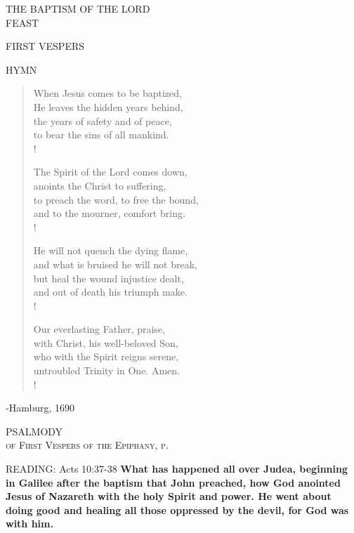 \begin{center}\normalsize THE BAPTISM OF THE LORD\\
\footnotesize FEAST
\end{center}

\begin{flushleft}\normalsize{\uppercase{FIRST VESPERS\\}}\end{flushleft}

\noindent\small{\uppercase{Hymn}}\normalsize
\begin{verse}
When Jesus comes to be baptized,\\
He leaves the hidden years behind,\\
the years of safety and of peace,\\
to bear the sins of all mankind.\\!

The Spirit of the Lord comes down,\\
anoints the Christ to suffering,\\
to preach the word, to free the bound,\\
and to the mourner, comfort bring.\\!

He will not quench the dying flame,\\
and what is bruised he will not break,\\
but heal the wound injustice dealt,\\
and out of death his triumph make.\\!

Our everlasting Father, praise,\\
with Christ, his well-beloved Son,\\
who with the Spirit reigns serene,\\
untroubled Trinity in One. Amen.\\!
\end{verse}
\begin{flushright}\tiny -Hamburg, 1690\end{flushright}

\noindent\small{\uppercase{PSALMODY}\\}
\textsc{of First Vespers of the Epiphany, p. \pageref{christmas:epiphany:firstVespers:psalmody}\\}

\noindent\small{\uppercase{READING:}}   Acts 10:37-38 \textbf{  What has happened all over Judea, beginning in Galilee after the baptism that John preached, how God anointed Jesus of Nazareth with the holy Spirit and power. He went about doing good and healing all those oppressed by the devil, for God was with him.\\}

